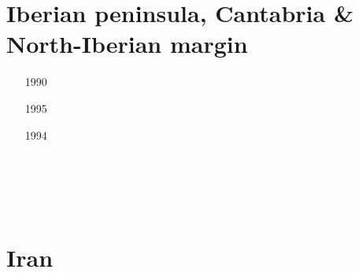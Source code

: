 \section{Iberian peninsula, Cantabria \& North-Iberian margin}

\begin{small}
\begin{itemize}
\item[1990]
\item[1995]
\item[1994]
\item[\nineteenninetysix]
\item[\twothousandtwo]
\item[\twothousandfour]
 \\
\item[\twothousandeleven]
\item[\twothousandfifteen]
 \\
 \\
\item[\twothousandtwentyone]
\item[\twothousandtwentythree]
\end{itemize}
\end{small}

\section{Iran}

\begin{small}
\begin{itemize}
\item[\twothousandthree] 
\item[\twothousandsix] 
\item[\twothousandten] 
\item[\twothousandeleven] 
\item[\twothousandthirteen] 
\item[\twothousandfourteen] 
\item[\twothousandsixteen] 
\item[\twothousandeighteen] 
\item[\twothousandtwenty] 
\item[\twothousandtwentythree] 
\end{itemize}
\end{small} 

